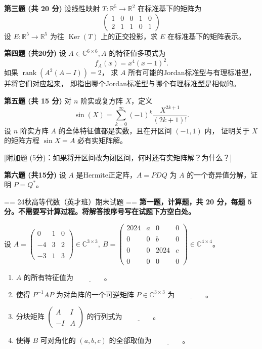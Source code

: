 \textbf{第三题 (共 20 分)} 设线性映射 $T: \mathbb{R}^{5} \rightarrow \mathbb{R}^{2}$ 在标准基下的矩阵为
$$\begin{pmatrix}1 & 0 & 0 & 1 & 0 \\2 & 1 & 1 & 0 & 1\end{pmatrix}$$
设 $E: \mathbb{R}^{5} \rightarrow \mathbb{R}^{5}$ 
为往 $\operatorname{Ker}(T)$ 上的正交投影，求 $E$ 在标准基下的矩阵表示。

\textbf{第四题 (共20分)} 设 $A \in \mathbb{C}^{6 \times 6}, A$ 的特征值多项式为
$$f_{A}(x)=x^{4}(x-1)^{2}.$$
如果 $\operatorname{rank}(A^{2}(A-I))=2$，
求 $A$ 所有可能的Jordan标准型与有理标准型，并将它们对应起来，
即指出哪个Jordan标准型与哪个有理标准型是相似的。

\textbf{第五题 (共 15 分)} 对 $n$ 阶实或复方阵 $X$，定义
$$\sin (X)=\sum_{k=0}^{\infty} (-1)^{k} \frac{X^{2k+1}}{(2k+1)!}.$$
设 $n$ 阶实方阵 $A$ 的全体特征值都是实数，且在开区间 $(-1,1)$ 内，
证明关于 $X$ 的矩阵方程 $\sin X=A$ 必有实矩阵解。

[附加题 (5分)：如果将开区间改为闭区间，何时还有实矩阵解？为什么？]

\textbf{第六题 (共15分)} 设 $A$ 是Hermite正定阵，$A=PDQ$ 为 $A$ 的一个奇异值分解，证明 $P=Q^{*}$。

== 24秋高等代数（英才班）期末试题 ==
\textbf{第一题，计算题，共 20 分，每题 5 分。不需要写计算过程。将解答按序号写在试题下方空白处。}

设 $A=\begin{pmatrix}0 & 1 & 0 \\ \\ -4 & 3 & 2 \\ \\ -3 & 1 & 3\end{pmatrix} \in \mathbb{C}^{3 \times 3}, 
\ B=\begin{pmatrix}2024 & a & 0 & 0 \\ \\ 0 & 0 & b & 0 \\ \\ 0 & 0 & 2024 & c \\ \\ 0 & 0 & 0 & 0\end{pmatrix} \in \mathbb{C}^{4 \times 4}$。
\begin{enumerate}
\item $A$ 的所有特征值为 $\underline{\qquad\qquad}$。
\item 使得 $P^{-1}AP$ 为对角阵的一个可逆矩阵 $P \in \mathbb{C}^{3 \times 3}$ 为 $\underline{\qquad\qquad}$。
\item 分块矩阵 $\begin{pmatrix}A & I \\ \\ -I & A\end{pmatrix}$ 的行列式为 $\underline{\qquad\qquad}$。
\item 使得 $B$ 可对角化的 $(a, b, c)$ 的全部取值为 $\underline{\qquad\qquad}$。
\end{enumerate}

